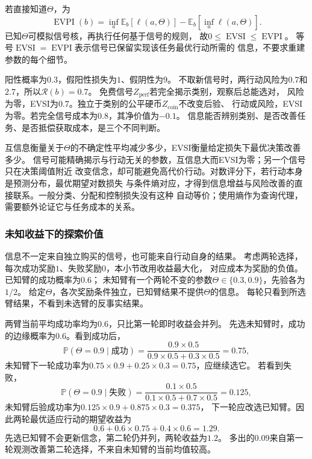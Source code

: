 若直接知道$\Theta$，为
\begin{equation}
  \operatorname{EVPI}(b)
  =\inf_a\mathbb E_b[\ell(a,\Theta)]
    -\mathbb E_b[\inf_a\ell(a,\Theta)].
  \label{eq:decision-evpi}
\end{equation}
已知$\Theta$可模拟信号核，再执行任何基于信号的规则，
故$0\leq\operatorname{EVSI}\leq\operatorname{EVPI}$。
等号$\operatorname{EVSI}=\operatorname{EVPI}$表示信号已保留实现该任务最优行动所需的
信息，不要求重建参数的每个细节。

\begin{example}[辨别信号与无关信号]
\label{ex:decision-informative-and-irrelevant-signals}
阳性概率为$0.3$，假阳性损失为$1$、假阴性为$9$。
不取新信号时，两行动风险为$0.7$和$2.7$，所以$\mathcal R(b)=0.7$。
免费信号$Z_{\mathrm{perf}}$若完全揭示类别，观察后总能选对，
风险为零，EVSI为$0.7$。独立于类别的公平硬币$Z_{\mathrm{coin}}$不改变后验、
行动或风险，EVSI为零。若完全信号成本为$0.8$，其净价值为$-0.1$。
信息能否辨别类别、是否改善任务、是否抵偿获取成本，是三个不同判断。
\end{example}

互信息衡量关于$\Theta$的不确定性平均减少多少，EVSI衡量给定损失下最优决策改善多少。
信号可能精确揭示与行动无关的参数，互信息大而EVSI为零；另一个信号只在决策阈值附近
改变信念，却可能避免高代价行动。对数评分下，若行动本身是预测分布，最优期望对数损失
与条件熵对应，才得到信息增益与风险改善的直接联系。一般分类、分配和控制损失没有这种
自动等价；使用熵作为查询代理，需要额外论证它与任务成本的关系。

\subsubsection{未知收益下的探索价值}

信息不一定来自独立购买的信号，也可能来自行动自身的结果。
考虑两轮选择，每次成功奖励$1$、失败奖励$0$，本小节改用收益最大化，
对应成本为奖励的负值。已知臂的成功概率为$0.6$；
未知臂有一个两轮不变的参数$\Theta\in\{0.3,0.9\}$，先验各为$1/2$。
给定$\Theta$，各次奖励条件独立，已知臂结果不提供$\Theta$的信息。
每轮只看到所选臂结果，不看到未选臂的反事实结果。

两臂当前平均成功率均为$0.6$，只比第一轮即时收益会并列。
先选未知臂时，成功的边缘概率为$0.6$。看到成功后，
\[
  \mathbb P(\Theta=0.9\mid\text{成功})
  =\frac{0.9\times0.5}{0.9\times0.5+0.3\times0.5}=0.75,
\]
未知臂下一轮成功率为$0.75\times0.9+0.25\times0.3=0.75$，应继续选它。
若看到失败，
\[
  \mathbb P(\Theta=0.9\mid\text{失败})
  =\frac{0.1\times0.5}{0.1\times0.5+0.7\times0.5}=0.125,
\]
未知臂后验成功率为$0.125\times0.9+0.875\times0.3=0.375$，
下一轮应改选已知臂。因此两轮最优适应行动的期望收益为
\begin{equation}
  0.6+0.6\times0.75+0.4\times0.6=1.29.
  \label{eq:decision-two-arm-information-value}
\end{equation}
先选已知臂不会更新信念，第二轮仍并列，两轮收益为$1.2$。
多出的$0.09$来自第一轮观测改善第二轮选择，不来自未知臂的当前均值较高。

